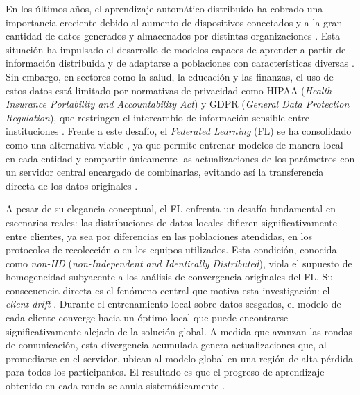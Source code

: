 
En los últimos años, el aprendizaje automático distribuido ha cobrado una importancia 
creciente debido al aumento de dispositivos conectados y a la gran cantidad de datos 
generados y almacenados por distintas organizaciones \cite{kairouz2021advances, mahmud2026survey}. 
Esta situación ha impulsado el desarrollo de modelos capaces de aprender a partir de información 
distribuida y de adaptarse a poblaciones con características diversas \cite{DBLP:journals/corr/abs-1908-07873}. 
Sin embargo, en sectores como la salud, la educación y las finanzas, el uso de estos datos está
limitado por normativas de privacidad como HIPAA (\textit{Health Insurance Portability and 
Accountability Act}) y GDPR (\textit{General Data Protection Regulation}), que restringen el 
intercambio de información sensible entre instituciones \cite{noor2026federated}. Frente a este 
desafío, el \textit{Federated Learning} (FL) se ha consolidado como una alternativa viable 
\cite{kairouz2021advances}, ya que permite entrenar modelos de manera local en cada entidad y 
compartir únicamente las actualizaciones de los parámetros con un servidor central encargado de 
combinarlas, evitando así la transferencia directa de los datos originales 
\cite{al2502principles,DBLP:journals/corr/McMahanMRA16}.


A pesar de su elegancia conceptual, el FL enfrenta un desafío fundamental en escenarios reales:
las distribuciones de datos locales difieren significativamente entre clientes, ya sea por 
diferencias en las poblaciones atendidas, en los protocolos de recolección o en los equipos 
utilizados. Esta condición, conocida como \textit{non-IID} (\textit{non-Independent and 
Identically Distributed}), viola el supuesto de homogeneidad subyacente a los análisis de 
convergencia originales del FL. Su consecuencia directa es el fenómeno central que motiva 
esta investigación: el \textit{client drift} \cite{DBLP:journals/corr/abs-1910-06378}. 
Durante el entrenamiento local sobre datos sesgados, el modelo de cada cliente converge hacia 
un óptimo local que puede encontrarse significativamente alejado de la solución global. A 
medida que avanzan las rondas de comunicación, esta divergencia acumulada genera actualizaciones 
que, al promediarse en el servidor, ubican al modelo global en una región de alta pérdida para 
todos los participantes. El resultado es que el progreso de aprendizaje obtenido en cada ronda 
se anula sistemáticamente \cite{seo2025understanding}.


